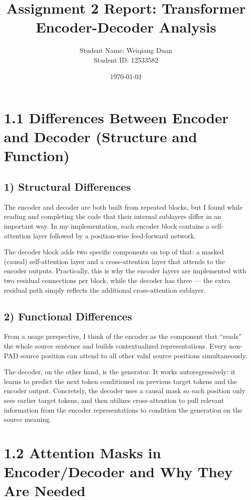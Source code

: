 \documentclass[11pt]{article}
\title{Assignment 2 Report: Transformer Encoder-Decoder Analysis}
\author{Student Name: Weiqiang Duan \\
Student ID: 12533582}
\date{\today}
\begin{document}
\maketitle

\section*{1.1 Differences Between Encoder and Decoder (Structure and Function)}

\subsection*{1) Structural Differences}
The encoder and decoder are both built from repeated blocks, but I found while reading and completing the code that their internal sublayers differ in an important way. In my implementation, each encoder block contains a self-attention layer followed by a position-wise feed-forward network. 

The decoder block adds two specific components on top of that: a masked (causal) self-attention layer and a cross-attention layer that attends to the encoder outputs. Practically, this is why the encoder layers are implemented with two residual connections per block, while the decoder has three — the extra residual path simply reflects the additional cross-attention sublayer.

\subsection*{2) Functional Differences}
From a usage perspective, I think of the encoder as the component that ``reads'' the whole source sentence and builds contextualized representations. Every non-PAD source position can attend to all other valid source positions simultaneously. 

The decoder, on the other hand, is the generator. It works autoregressively: it learns to predict the next token conditioned on previous target tokens and the encoder output. Concretely, the decoder uses a causal mask so each position only sees earlier target tokens, and then utilizes cross-attention to pull relevant information from the encoder representations to condition the generation on the source meaning.


\section*{1.2 Attention Masks in Encoder/Decoder and Why They Are Needed}
\end{document}
